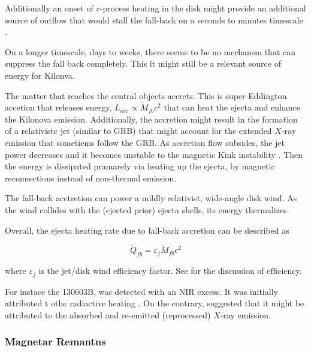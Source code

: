 \documentclass[11pt,a4paper,headinclude=true,DIV=14,BCOR=8mm,chapterprefix,listof=totoc,twoside,openright,abstracton]{scrbook}
\begin{document}
Additionally an onset of $r$-process heating in the disk might provide an additional source of outflow that would stall the fall-back on a seconds to minutes timescale \cite{Metzger et al 2010a)}.

On a longer timescale, days to weeks, there seems to be no mechansm that can suppress the fall back completely. This it might still be a relevant source of energy for Kilonva.

The matter that reaches the central objects accrets. This is super-Eddington accetion that releases energy, $L_{acc} \propto \dot{M}_{fb} c^2$ that can heat the ejecta and enhance  the Kilonova emission. Additionally, the accretion might result in the formation of a relativistc jet (similar to GRB) that might account for the extended $X$-ray emission that sometiems follow the GRB.
As accretion flow subsides, the jet power decreases and it becomes unstable to the magnetic Kink instability \cite{(Bromberg and Tchekhovskoy 2016)}. Then the energy is dissipated pramarely via heating up the ejecta, by magnetic reconnections instead of non-thermal emission. 

The fall-back acctretion can power a mildly relativist, wide-angle disk wind. As the wind collides with the (ejected prior) ejecta shells, its energy thermalizes. 

Overall, the ejecta heating rate due to fall-back accretion can be described as 

\begin{equation}
    \dot{Q}_{fb} = \varepsilon_{j}\dot{M}_{fb}c^2
\end{equation}

where $\varepsilon_{j}$ is the jet/disk wind efficiency factor. See \cite{Tchekhovskoy et al 2011). Kisaka and Ioka (2015)} for the discussion of efficiency.

For instace the 130603B, was detected with an NIR excess. It was initially attributed t othe radiactive heating \cite{Tanvir et al (2013)} \cite{Berger et al (2013)}. On the contrary, \cite{Kisaka et al (2016)} suggested that it might be attributed to the absorbed and re-emitted (reprocessed) $X$-ray emission. 


\subsubsection{Magnetar Remantns}




\newpage


\end{document}
